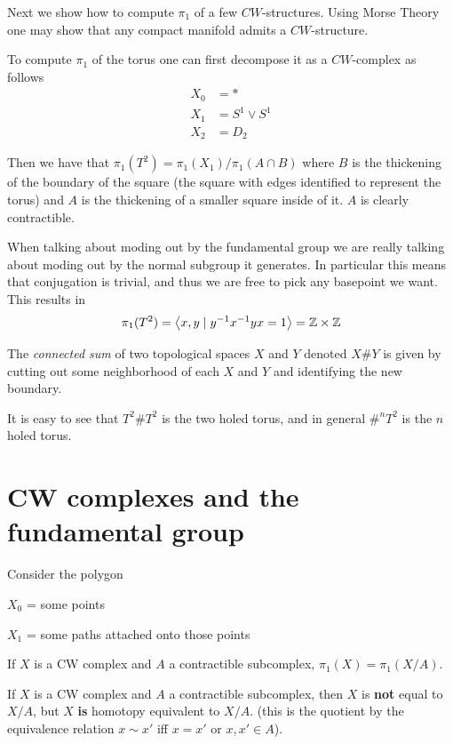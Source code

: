 \documentclass[11pt,leqno,oneside]{amsart}
\newenvironment{dateenv}{
  \vspace{1em}
}{
  \vspace{1em}
}
\newcommand{\mydate}[4]{
  \newdate{#1}{#2}{#3}{#4}
  \begin{dateenv}
    \hfill\displaydate{#1}
  \end{dateenv}
}
\numberwithin{thm}{section}
\newcommand{\fund}[1][1]{\pi_{#1}}
\begin{document}
Next we show how to compute \(\pi_1\) of a few
\(CW\)-structures. Using Morse Theory one may show that any compact
manifold admits a \(CW\)-structure.

To compute \(\pi_1\) of the torus one can first decompose it as a
\(CW\)-complex as follows
\begin{align*}
  X_0 &= *\\
  X_1 &= S^1 \vee S^1\\
  X_2 &= D_2
\end{align*}

Then we have that \(\pi_1(T^2) = \pi_1(X_1)/\pi_1(A \cap B)\) where
\(B\) is the thickening of the boundary of the square (the square with edges identified to represent the torus) and \(A\) is the thickening of a smaller square
inside of it. \(A\) is clearly contractible.

When talking about moding out by the fundamental group we are really
talking about moding out by the normal subgroup it generates. In
particular this means that conjugation is trivial, and thus we are
free to pick any basepoint we want. This results in
\[\pi_1(T^2) = \left\langle x,y \mid y^{-1}x^{-1}y x = 1 \right\rangle = {\mathbb Z}
    \times {\mathbb Z}\]

\begin{defn}
  The \emph{connected sum} of two topological spaces \(X\) and \(Y\)
  denoted \(X \# Y \) is given by cutting out some neighborhood of
  each \(X\) and \(Y\) and identifying the new boundary.
\end{defn}

It is easy to see that \(T^2 \# T^2\) is the two holed torus, and in general \(\#^n T^2\) is the \(n\) holed torus.

\mydate{e7}{8}{2}{2017}

\section{CW complexes and the fundamental group}

Consider the polygon
\begin{figure}
  \label{fig:star}
\end{figure}

$X_0$ = some points

$X_1$ = some paths attached onto those points


\begin{thm}
  If $X$ is a CW complex and $A$ a contractible subcomplex, $\fund(X) = \fund(X/A)$.
\end{thm}
\begin{rmk}
  If $X$ is a CW complex and $A$ a contractible subcomplex, then $X$ is \textbf{not} equal to $X/A$, but $X$ \textbf{is} homotopy equivalent to $X/A$. (this is the quotient by the equivalence relation $x \sim x'$ iff $x = x'$ or $x, x' \in A$).
\end{rmk}
\end{document}
